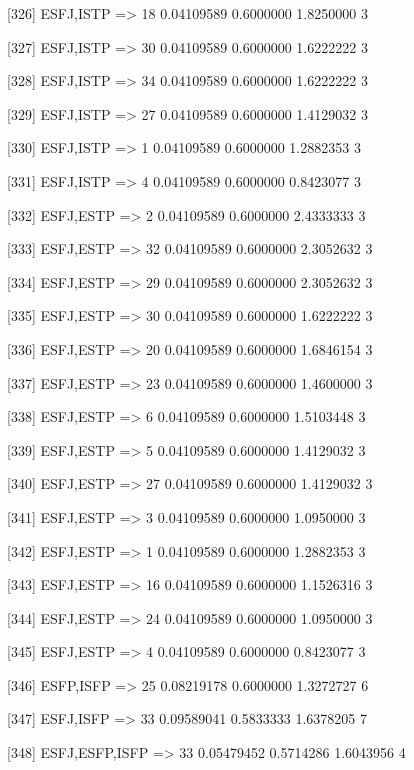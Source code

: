 [326] {ESFJ,ISTP}           => {18} 0.04109589 0.6000000  1.8250000  3   

[327] {ESFJ,ISTP}           => {30} 0.04109589 0.6000000  1.6222222  3   

[328] {ESFJ,ISTP}           => {34} 0.04109589 0.6000000  1.6222222  3   

[329] {ESFJ,ISTP}           => {27} 0.04109589 0.6000000  1.4129032  3   

[330] {ESFJ,ISTP}           => {1}  0.04109589 0.6000000  1.2882353  3   

[331] {ESFJ,ISTP}           => {4}  0.04109589 0.6000000  0.8423077  3   

[332] {ESFJ,ESTP}           => {2}  0.04109589 0.6000000  2.4333333  3   

[333] {ESFJ,ESTP}           => {32} 0.04109589 0.6000000  2.3052632  3   

[334] {ESFJ,ESTP}           => {29} 0.04109589 0.6000000  2.3052632  3   

[335] {ESFJ,ESTP}           => {30} 0.04109589 0.6000000  1.6222222  3   

[336] {ESFJ,ESTP}           => {20} 0.04109589 0.6000000  1.6846154  3   

[337] {ESFJ,ESTP}           => {23} 0.04109589 0.6000000  1.4600000  3   

[338] {ESFJ,ESTP}           => {6}  0.04109589 0.6000000  1.5103448  3   

[339] {ESFJ,ESTP}           => {5}  0.04109589 0.6000000  1.4129032  3   

[340] {ESFJ,ESTP}           => {27} 0.04109589 0.6000000  1.4129032  3   

[341] {ESFJ,ESTP}           => {3}  0.04109589 0.6000000  1.0950000  3   

[342] {ESFJ,ESTP}           => {1}  0.04109589 0.6000000  1.2882353  3   

[343] {ESFJ,ESTP}           => {16} 0.04109589 0.6000000  1.1526316  3   

[344] {ESFJ,ESTP}           => {24} 0.04109589 0.6000000  1.0950000  3   

[345] {ESFJ,ESTP}           => {4}  0.04109589 0.6000000  0.8423077  3   

[346] {ESFP,ISFP}           => {25} 0.08219178 0.6000000  1.3272727  6   

[347] {ESFJ,ISFP}           => {33} 0.09589041 0.5833333  1.6378205  7   

[348] {ESFJ,ESFP,ISFP}      => {33} 0.05479452 0.5714286  1.6043956  4   

